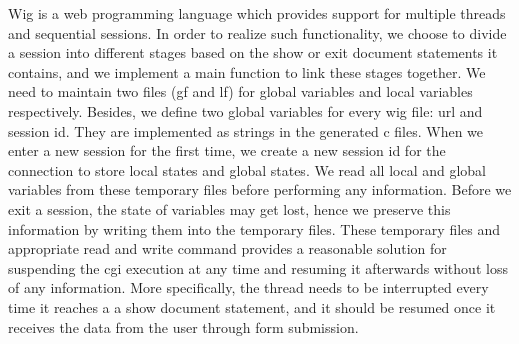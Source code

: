 \documentclass{WigReport}
\begin{document}
Wig is a web programming language which provides support for multiple threads and sequential sessions. In order to realize such functionality, we choose to divide a session into different stages based on the show or exit document statements it contains, and we implement a main function to link these stages together. We need to maintain two files (gf and lf) for global variables and local variables respectively. Besides, we define two global variables for every wig file: url and session id. They are implemented as strings in the generated c files. When we enter a new session for the first time, we create a new session id for the connection to store local states and global states. We read all local and global variables from these temporary files before performing any information. Before we exit a session, the state of variables may get lost, hence we preserve this information by writing them into the temporary files. These temporary files and appropriate read and write command provides a reasonable solution for suspending the cgi execution at any time and resuming it afterwards without loss of any information. More specifically, the thread needs to be interrupted every time it reaches a a show document statement, and it should be resumed once it receives the data from the user through form submission.
\end{document}
